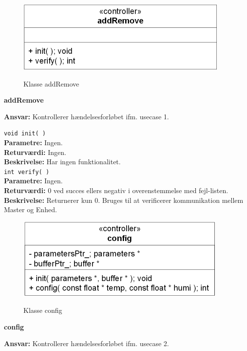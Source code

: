 \begin{figure}[htbp] \centering
{\includegraphics[scale=1.3]{filer/design/Klassediagrammer/sw_psoc_addRemove}}
\caption{Klasse addRemove}
\label{fig:sw_psoc_class_addremove}
\end{figure} 

{\centering
\textbf{addRemove}\par
}
\textbf{Ansvar:} Kontrollerer hændelsesforløbet ifm. usecase 1. \

\verb+void init( )+\\
\textbf{Parametre:} Ingen. \\
\textbf{Returværdi:} Ingen. \\
\textbf{Beskrivelse:} Har ingen funktionalitet.\\

\verb+int verify( )+\\
\textbf{Parametre:} Ingen. \\
\textbf{Returværdi:} 0 ved succes ellers negativ i overenstemmelse med fejl-listen. \\
\textbf{Beskrivelse:} Returnerer kun 0. Bruges til at verificerer kommunikation mellem Master og Enhed.\\

\begin{figure}[htbp] \centering
{\includegraphics[scale=1.3]{filer/design/Klassediagrammer/sw_psoc_config}}
\caption{Klasse config}
\label{fig:sw_psoc_class_config}
\end{figure} 

{\centering
\textbf{config}\par
}
\textbf{Ansvar:} Kontrollerer hændelsesforløbet ifm. usecase 2. \


